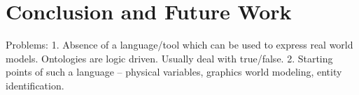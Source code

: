 \chapter{Conclusion and Future Work}

Problems:
  1. Absence of a language/tool which can be used to express real world models. Ontologies are logic driven. Usually deal with true/false.
  2. Starting points of such a language -- physical variables, graphics world modeling, entity identification.
